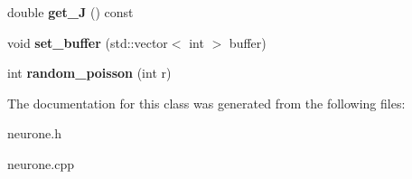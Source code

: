 \begin{DoxyCompactItemize}
\item 
\hypertarget{classNeurone_a0a1f8d8b3d7a13ea518fb502e474674f}{double {\bfseries get\-\_\-\-J} () const }\label{classNeurone_a0a1f8d8b3d7a13ea518fb502e474674f}

\item 
\hypertarget{classNeurone_a03434194cee2b096d598ce337277fb76}{void {\bfseries set\-\_\-buffer} (std\-::vector$<$ int $>$ buffer)}\label{classNeurone_a03434194cee2b096d598ce337277fb76}

\item 
\hypertarget{classNeurone_a7bd2b2b9b8a8fa868969d03c825d3978}{int {\bfseries random\-\_\-poisson} (int r)}\label{classNeurone_a7bd2b2b9b8a8fa868969d03c825d3978}

\end{DoxyCompactItemize}


The documentation for this class was generated from the following files\-:\begin{DoxyCompactItemize}
\item 
neurone.\-h\item 
neurone.\-cpp\end{DoxyCompactItemize}
